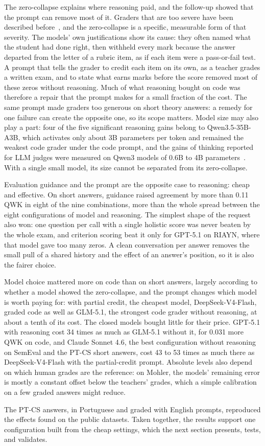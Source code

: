 The zero-collapse explains where reasoning paid, and the follow-up showed that the prompt can remove most of it.
Graders that are too severe have been described
before~\cite{pathak_rubric_2025,venkatraman_llmbased_2026,sapkota_math_2026}, and the zero-collapse is a specific,
measurable form of that severity. The models' own justifications show its cause: they often named what the student had done right,
then withheld every mark because the answer departed from the letter of a rubric item, as if each item were a
pass-or-fail test. A prompt that tells the grader to credit each item on its own, as a teacher grades a written
exam, and to state what earns marks before the score removed most of these zeros without reasoning. Much of what
reasoning bought on code was therefore a repair that the prompt makes for a small fraction of the cost. The same
prompt made graders too generous on short theory answers: a remedy for one failure can create the opposite one, so its
scope matters. Model size may also play a part: four of the five significant reasoning gains belong to
Qwen3.5-35B-A3B, which activates only about 3B parameters per token and remained the weakest code grader under
the code prompt, and the gains of thinking reported for LLM judges were measured on Qwen3 models of 0.6B to 4B
parameters~\cite{jayarao_explicit_2025}. With a single small model, its size cannot be separated from its
zero-collapse.

Evaluation guidance and the prompt are the opposite case to reasoning: cheap and effective. On short answers,
guidance raised agreement by more than 0.11 QWK in eight of the nine combinations, more than the whole spread
between the eight configurations of model and reasoning. The simplest shape of the request also won: one
question per call with a single holistic score was never beaten by the whole exam, and criterion scoring beat it
only for GPT-5.1 on RIAYN, where that model gave too many zeros. A clean conversation per answer removes the
small pull of a shared history and the effect of an answer's position, so it is also the fairer choice.

Model choice mattered more on code than on short answers, largely according to whether a model showed the
zero-collapse, and the prompt changes which model is worth paying for: with partial credit, the cheapest model,
DeepSeek-V4-Flash, graded code as well as GLM-5.1, the strongest code grader without reasoning, at about a tenth
of its cost. The closed models bought little for their price. GPT-5.1 with reasoning cost 34 times as much as
GLM-5.1 without it, for 0.031 more QWK on code, and Claude Sonnet 4.6, the best configuration without reasoning on
SemEval and the PT-CS short answers, cost 43 to 53 times as much there as DeepSeek-V4-Flash with the
partial-credit prompt. Absolute levels also depend on which human grades are the reference: on Mohler, the
models' remaining error is mostly a constant offset below the teachers' grades, which a simple calibration on a
few graded answers might reduce.

The PT-CS answers, in Portuguese and graded with English prompts, reproduced the effects found on the public
datasets. Taken together, the results support one configuration built from the cheap settings, which the next
section presents, tests, and validates.

